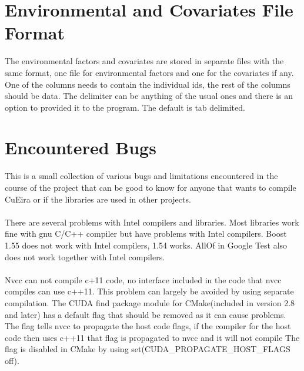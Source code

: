 \documentclass[10pt,a4paper]{report}
\newcounter{algorithmCode}
\begin{document}

\section{Environmental and Covariates File Format}
The environmental factors and covariates are stored in separate files with the same format, one file for environmental factors and one for the covariates if any. One of the columns needs to contain the individual ids, the rest of the columns should be data. The delimiter can be anything of the usual ones and there is an option to provided it to the program. The default is tab delimited.



\section{Encountered Bugs}
\label{found_bugs}
This is a small collection of various bugs and limitations encountered in the course of the project that can be good to know for anyone that wants to compile CuEira or if the libraries are used in other projects.\\
\\
There are several problems with Intel compilers and libraries. Most libraries work fine with gnu C/C++ compiler but have problems with Intel compilers. Boost 1.55 does not work with Intel compilers, 1.54 works. AllOf in Google Test also does not work together with Intel compilers.\\
\\
Nvcc can not compile c+11 code, no interface included in the code that nvcc compiles can use c++11. This problem can largely be avoided by using separate compilation. The CUDA find package module for CMake(included in version 2.8 and later) has a default flag that should be removed as it can cause problems. The flag tells nvcc to propagate the host code flags, if the compiler for the host code then uses c++11 that flag is propagated to nvcc and it will not compile The flag is disabled in CMake by using set(CUDA\_PROPAGATE\_HOST\_FLAGS off).
\end{document}
